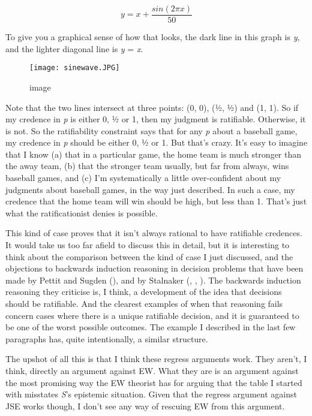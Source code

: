 \documentclass[
  10pt,
  letterpaper,
  DIV=11,
  numbers=noendperiod,
  twoside]{scrartcl}
\begin{document}
\[
y = x + \frac{sin(2\pi x)}{50}
\]

To give you a graphical sense of how that looks, the dark line in this
graph is \emph{y}, and the lighter diagonal line is \emph{y} = \emph{x}.

\begin{figure}[H]

{\centering \texttt{[image: sinewave.JPG]}

}

\caption{image}

\end{figure}%

Note that the two lines intersect at three points: (0, 0), (½, ½) and
(1, 1). So if my credence in \emph{p} is either 0, ½ or 1, then my
judgment is ratifiable. Otherwise, it is not. So the ratifiability
constraint says that for any \emph{p} about a baseball game, my credence
in \emph{p} should be either 0, ½ or 1. But that's crazy. It's easy to
imagine that I know (a) that in a particular game, the home team is much
stronger than the away team, (b) that the stronger team usually, but far
from always, wins baseball games, and (c) I'm systematically a little
over-confident about my judgments about baseball games, in the way just
described. In such a case, my credence that the home team will win
should be high, but less than 1. That's just what the ratificationist
denies is possible.

This kind of case proves that it isn't always rational to have
ratifiable credences. It would take us too far afield to discuss this in
detail, but it is interesting to think about the comparison between the
kind of case I just discussed, and the objections to backwards induction
reasoning in decision problems that have been made by Pettit and Sugden
(), and by Stalnaker
(, ,
). The backwards induction reasoning
they criticise is, I think, a development of the idea that decisions
should be ratifiable. And the clearest examples of when that reasoning
fails concern cases where there is a unique ratifiable decision, and it
is guaranteed to be one of the worst possible outcomes. The example I
described in the last few paragraphs has, quite intentionally, a similar
structure.

The upshot of all this is that I think these regress arguments work.
They aren't, I think, directly an argument against EW. What they are is
an argument against the most promising way the EW theorist has for
arguing that the table I started with misstates \emph{S}'s epistemic
situation. Given that the regress argument against JSE works though, I
don't see any way of rescuing EW from this argument.
\end{document}
